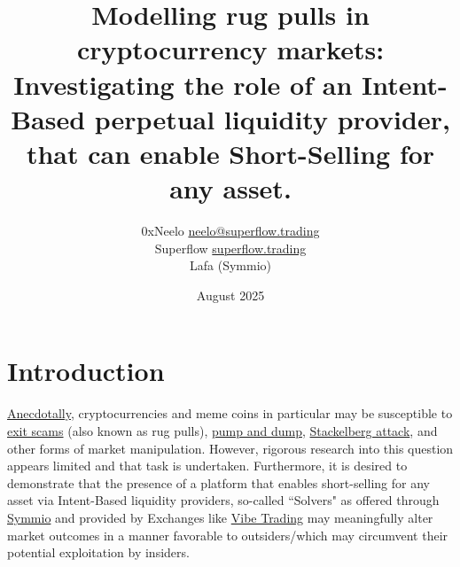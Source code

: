 \documentclass{article}
\title{Modelling rug pulls in cryptocurrency markets: Investigating the role of an Intent-Based perpetual liquidity provider, that can enable Short-Selling for any asset.}
\author{
  0xNeelo \href{mailto:neelo@superflow.trading}{neelo@superflow.trading} \\
  Superflow \href{https://superflow.trading}{superflow.trading} \\
  Lafa (Symmio)
}
\date{August 2025}
\begin{document}
\maketitle

\section{Introduction}
\href{https://www.pbs.org/newshour/show/explaining-meme-coins-and-why-the-joke-inspired-cryptocurrencies-often-crash}{Anecdotally}, cryptocurrencies and meme coins in particular may be susceptible to \href{https://en.wikipedia.org/wiki/Exit_scam}{exit scams} (also known as rug pulls), \href{https://en.wikipedia.org/wiki/Pump_and_dump}{pump and dump}, \href{https://ebooks.iospress.nl/DOI/10.3233/FAIA230501}{Stackelberg attack}, and other forms of market manipulation.  However, rigorous research into this question appears limited and that task is undertaken.  Furthermore, it is desired to demonstrate that the presence of a platform that enables short-selling for any asset via Intent-Based liquidity providers, so-called ``Solvers" as offered through \href{https://www.symm.io/}{Symmio} and provided by Exchanges like \href{https://www.vibe.trading/}{Vibe Trading} may meaningfully alter market outcomes in a manner favorable to outsiders/which may circumvent their potential exploitation by insiders.
\end{document}
